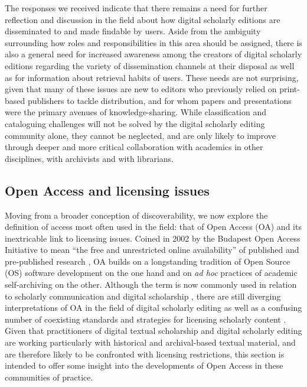 \begin{paper}
The responses we received indicate that there remains a need for further
reflection and discussion in the field about how digital scholarly
editions are disseminated to and made findable by users. Aside from the
ambiguity surrounding how roles and responsibilities in this area should
be assigned, there is also a general need for increased awareness among
the creators of digital scholarly editions regarding the variety of
dissemination channels at their disposal as well as for information
about retrieval habits of users. These needs are not surprising, given
that many of these issues are new to editors who previously relied on
print-based publishers to tackle distribution, and for whom papers and
presentations were the primary avenues of knowledge-sharing. While
classification and cataloguing challenges will not be solved by the
digital scholarly editing community alone, they cannot be neglected, and
are only likely to improve through deeper and more critical
collaboration with academics in other disciplines, with archivists and
with librarians.

\subsection{Open Access and licensing
issues}

Moving from a broader conception of discoverability, we now explore the
definition of access most often used in the field: that of Open Access
(OA) and its inextricable link to licensing issues. Coined in 2002 by
the Budapest Open Access Initiative to mean ``the free and unrestricted
online availability'' of published and pre-published research \citep{chan_read_2002}, OA builds on a longstanding tradition of Open Source (OS)
software development on the one hand and on \emph{ad hoc} practices of academic
self-archiving on the other. Although the term is now commonly used in
relation to scholarly communication and digital scholarship \citep{suber_open_2012,eve_open_2014}, there are still diverging interpretations of OA in the field
of digital scholarly editing as well as a confusing number of coexisting
standards and strategies for licensing scholarly content \citep[440]{sichani_beyond_2017}. Given that practitioners of digital textual scholarship and
digital scholarly editing are working particularly with historical and
archival-based textual material, and are therefore likely to be
confronted with licensing restrictions, this section is intended to
offer some insight into the developments of Open Access in these
communities of practice.


\end{paper}
